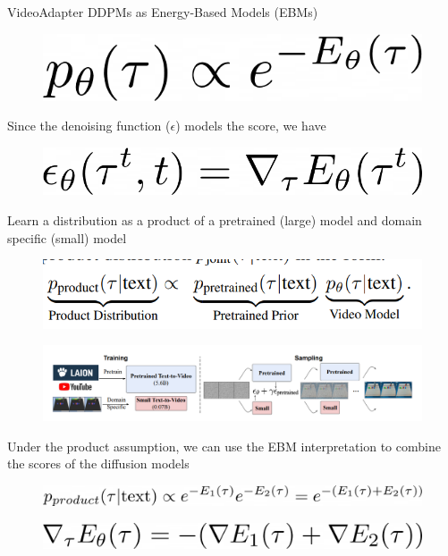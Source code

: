 \begin{frame}[allowframebreaks]{VideoAdapter}
DDPMs as Energy-Based Models (EBMs)
\begin{figure}
    \centering
    \includegraphics[width=0.35\linewidth,height=\textheight,keepaspectratio]{images/adv-img-gen/slide_162_1_img.png}
\end{figure}
\vspace{1em}
Since the denoising function ($\epsilon$) models the score, we have
\begin{figure}
    \centering
    \includegraphics[width=0.4\linewidth,height=\textheight,keepaspectratio]{images/adv-img-gen/slide_162_2_img.png}
\end{figure}

\framebreak
Learn a distribution as a product of a pretrained (large) model and domain specific (small) model
\begin{figure}
    \centering
    \includegraphics[width=0.7\linewidth,height=\textheight,keepaspectratio]{images/adv-img-gen/slide_163_1_img.png}
\end{figure}
\begin{figure}
    \centering
    \includegraphics[width=1.05\linewidth,height=\textheight,keepaspectratio]{images/adv-img-gen/slide_163_2_img.png}
\end{figure}

\framebreak
Under the product assumption, we can use the EBM interpretation to combine the scores of the diffusion models
\vspace{1em}
\begin{figure}
    \centering
    \includegraphics[width=\linewidth,height=\textheight,keepaspectratio]{images/adv-img-gen/slide_164_1_img.png}
\end{figure}
\vspace{1em}
\begin{figure}
    \centering
    \includegraphics[width=0.7\linewidth,height=\textheight,keepaspectratio]{images/adv-img-gen/slide_164_2_img.png}
\end{figure}


\end{frame}
